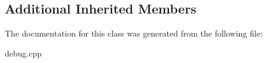 \subsection*{Additional Inherited Members}


The documentation for this class was generated from the following file\+:\begin{DoxyCompactItemize}
\item 
debug.\+cpp\end{DoxyCompactItemize}
